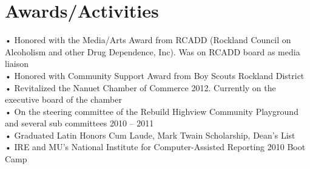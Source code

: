\documentclass[]{hieudo-build}
\begin{document}
\begin{minipage}[t]{0.37\textwidth}
\section{Awards/Activities} 
• Honored with the Media/Arts Award from RCADD (Rockland Council on Alcoholism and other Drug Dependence, Inc). Was on RCADD board as media liaison\\
• Honored with Community Support Award from Boy Scouts Rockland District\\
• Revitalized the Nanuet Chamber of Commerce 2012. Currently on the executive board of the chamber\\
• On the steering committee of the Rebuild Highview Community Playground and several sub committees 2010 – 2011\\
• Graduated Latin Honors Cum Laude, Mark Twain Scholarship, Dean’s List\\
• IRE and MU’s National Institute for Computer-Assisted Reporting 2010 Boot Camp\\


%
%
\end{minipage} 
\hfill
\end{document}
